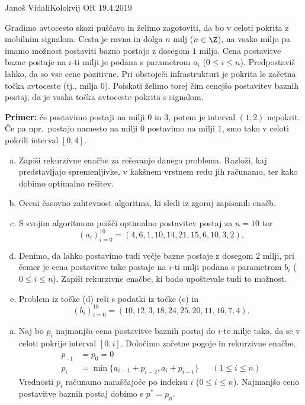 \begin{naloga}{Janoš Vidali}{Kolokvij OR 19.4.2019}
\begin{vprasanje}
Gradimo avtocesto skozi puščavo in želimo zagotoviti,
da bo v celoti pokrita z mobilnim signalom.
Cesta je ravna in dolga $n$ milj ($n \in \Z$),
na vsako miljo pa imamo možnost postaviti bazno postajo z dosegom $1$ miljo.
Cena postavitve bazne postaje na $i$-ti milji
je podana s parametrom $a_i$ ($0 \le i \le n$).
Predpostaviš lahko, da so vse cene pozitivne.
Pri obstoječi infrastrukturi je pokrita le začetna točka avtoceste
(tj., milja $0$).
Poiskati želimo torej čim cenejšo postavitev baznih postaj,
da je vsaka točka avtoceste pokrita s signalom.

\medskip
\noindent
{\bf Primer:} če postavimo postaji na milji $0$ in $3$,
potem je interval $(1, 2)$ nepokrit.
Če pa npr.~postajo namesto na milji $0$ postavimo na milji $1$,
smo tako v celoti pokrili interval $[0, 4]$.

\begin{enumerate}[(a)]
\item Zapiši rekurzivne enačbe za reševanje danega problema.
Razloži, kaj pred\-stav\-lja\-jo spremenljivke,
v kakšnem vrstnem redu jih računamo,
ter kako dobimo optimalno rešitev.

\item Oceni časovno zahtevnost algoritma, ki sledi iz zgoraj zapisanih enačb.

\item S svojim algoritmom poišči optimalno postavitev postaj za $n = 10$ ter
$$
(a_i)_{i=0}^{10} = (4,  6,  1, 10, 14, 21, 15,  6, 10,  3,  2) .
$$

\item Denimo, da lahko postavimo tudi večje bazne postaje z dosegom $2$ milji,
pri čemer je cena postavitve take postaje na $i$-ti milji
podana s parametrom $b_i$ ($0 \le i \le n$).
Zapiši rekurzivne enačbe, ki bodo upoštevale tudi to možnost.

\item Problem iz točke (d) reši s podatki iz točke (c) in
$$
(b_i)_{i=0}^{10} = (10, 12, 3, 18, 24, 25, 20, 11, 16,  7,  4) .
$$
\end{enumerate}
\end{vprasanje}

\begin{odgovor}
\begin{enumerate}[(a)]
\item Naj bo $p_i$ najmanjša cena postavitve baznih postaj
do $i$-te milje tako,
da se v celoti pokrije interval $[0, i]$.
Določimo začetne pogoje in rekurzivne enačbe.
\begin{align*}
p_{-1} &= p_0 = 0 \\
p_i &= \min\{a_{i-1} + p_{i-2}, a_i + p_{i-1}\} && (1 \le i \le n)
\end{align*}
Vrednosti $p_i$ računamo naraščajoče po indeksu $i$ ($0 \le i \le n$).
Najmanjšo ceno postavitve baznih postaj dobimo s $p^* = p_n$.


\end{enumerate}
\end{odgovor}
\end{naloga}
